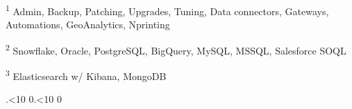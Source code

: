 \documentclass[a4paper,11pt]{article}
\renewcommand{\scriptsize}{\fontsize{9}{10}\selectfont}
\newcommand{\sqcite}[1]{\textsuperscript{#1}}
\begin{document}
\begin{flushleft}
    {\scriptsize \sqcite{1} Admin, Backup, Patching, Upgrades, Tuning, Data connectors, Gateways, Automations, GeoAnalytics, Nprinting}

    {\scriptsize \sqcite{2} Snowflake, Oracle, PostgreSQL, BigQuery, MySQL, MSSQL, Salesforce SOQL}

    {\scriptsize \sqcite{3} Elasticsearch w/ Kibana, MongoDB}
\end{flushleft}

\begin{flushright}
    \tiny \the\year.\ifnum\the\month<10 0\fi\the\month.\ifnum\the\day<10 0\fi\the\day
\end{flushright}
\end{document}
